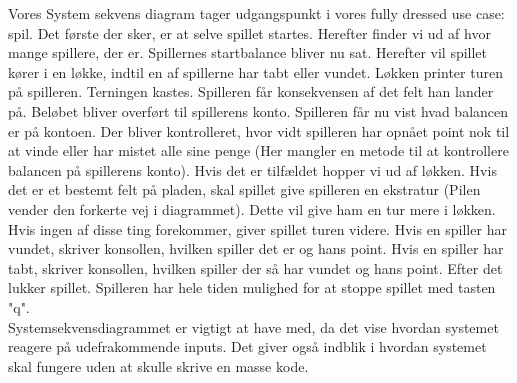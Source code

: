 Vores System sekvens diagram tager udgangspunkt i vores fully dressed use case: spil. Det første der sker, er at selve spillet startes. Herefter finder vi ud af hvor mange spillere, der er. Spillernes startbalance bliver nu sat. Herefter vil spillet kører i en løkke, indtil en af spillerne har tabt eller vundet. Løkken printer turen på spilleren. Terningen kastes. Spilleren får konsekvensen af det felt han lander på. Beløbet bliver overført til spillerens konto. Spilleren får nu vist hvad balancen er på kontoen. Der bliver kontrolleret, hvor vidt spilleren har opnået point nok til at vinde eller har mistet alle sine penge (Her mangler en metode til at kontrollere balancen på spillerens konto). Hvis det er tilfældet hopper vi ud af løkken. Hvis det er et bestemt felt på pladen, skal spillet give spilleren en ekstratur (Pilen vender den forkerte vej i diagrammet). Dette vil give ham en tur mere i løkken. Hvis ingen af disse ting forekommer, giver spillet turen videre. Hvis en spiller har vundet, skriver konsollen, hvilken spiller det er og hans point. Hvis en spiller har tabt, skriver konsollen, hvilken spiller der så har vundet og hans point. Efter det lukker spillet. Spilleren har hele tiden mulighed for at stoppe spillet med tasten "q".
\\
Systemsekvensdiagrammet er vigtigt at have med, da det vise hvordan systemet reagere på udefrakommende inputs. Det giver også indblik i hvordan systemet skal fungere uden at skulle skrive en masse kode.
